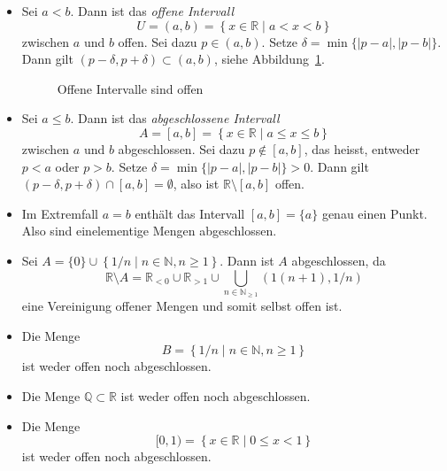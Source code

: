 \documentclass[../main.tex]{subfiles}
\begin{document}
\begin{examples}
  \leavevmode
  \begin{itemize}
    \item Sei
      $a < b$. Dann ist
      das \emph{offene Intervall}
      \[
        U = (a, b) = \left\{x \in \mathbb{R} \mid a < x < b\right\}
      \]
      zwischen $a$ und $b$ offen. Sei dazu $p \in (a, b)$. Setze
      $\delta = \min \{|p - a|, |p - b|\}$.
      Dann gilt
      $(p - \delta, p + \delta) \subset (a, b)$,
      siehe Abbildung~\ref{fig:offen}.
      \begin{figure}[htb]
        \centering
        
        \caption{Offene Intervalle
        sind offen}%
        \label{fig:offen}
      \end{figure}
      
    \item Sei $a \leq b$. Dann ist das \emph{abgeschlossene Intervall}
      \[
        A = [a, b] = \left\{x \in \mathbb{R} \mid a \leq x \leq b\right\}
      \]
      zwischen $a$ und $b$ abgeschlossen.
      Sei dazu $p \notin [a,b]$, das heisst, entweder
      $p < a$ oder $p > b$.
      Setze $\delta = \min \{|p- a|, |p-b|\} > 0$.
      Dann gilt
      $(p - \delta, p + \delta) \cap [a, b] = \emptyset$,
      also ist $\mathbb{R} \setminus [a, b]$ offen.
    \item Im Extremfall $a = b$ enthält das Intervall
      $[a,b] = \{a\}$ genau einen Punkt. Also
      sind einelementige Mengen abgeschlossen.
    \item Sei $A = \{0\} \cup \left\{1/n \mid n \in 
      \mathbb{N}, n \geq 1\right\}$.
      Dann ist $A$ abgeschlossen, da
      \[
        \mathbb{R} \setminus A = \mathbb{R}_{<0} \cup
        \mathbb{R}_{>1} \cup \bigcup_{n \in \mathbb{N}_{\geq 1}}
        \left(1(n+1), 1/n\right)
      \]
      eine Vereinigung offener Mengen und somit selbst offen ist.
    \item Die Menge
      \[
        B = \left\{1/n \mid n \in \mathbb{N}, n \geq 1\right\}
      \]
      ist weder offen noch abgeschlossen.
    \item Die Menge $\mathbb{Q} \subset \mathbb{R}$ 
      ist weder offen noch abgeschlossen.
    \item Die Menge
      \[
        [0, 1) = \left\{x \in \mathbb{R} \mid 0 \leq%
        x < 1\right\}
      \]
      ist weder offen noch abgeschlossen.
  \end{itemize}
\end{examples}
\end{document}
